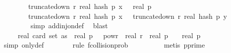 \begin{isabellebody}
\ \ \ \ \ \ \ \ truncate{\isacharunderscore}{\kern0pt}down\ r\ {\isacharparenleft}{\kern0pt}real\ {\isacharparenleft}{\kern0pt}hash\ p\ x\ {\isasymomega}{\isacharparenright}{\kern0pt}{\isacharparenright}{\kern0pt}\ {\isasymle}\ real\ p\ {\isasymand}\ \isanewline
\ \ \ \ \ \ \ \ truncate{\isacharunderscore}{\kern0pt}down\ r\ {\isacharparenleft}{\kern0pt}real\ {\isacharparenleft}{\kern0pt}hash\ p\ x\ {\isasymomega}{\isacharparenright}{\kern0pt}{\isacharparenright}{\kern0pt}\ {\isacharequal}{\kern0pt}\ truncate{\isacharunderscore}{\kern0pt}down\ r\ {\isacharparenleft}{\kern0pt}real\ {\isacharparenleft}{\kern0pt}hash\ p\ y\ {\isasymomega}{\isacharparenright}{\kern0pt}{\isacharparenright}{\kern0pt}{\isacharbraceright}{\kern0pt}{\isachardoublequoteclose}\isanewline
\ \ \ \ \ \ \ \isamarkupfalse%
\ {\isacharparenleft}{\kern0pt}simp\ add{\isacharcolon}{\kern0pt}inj{\isacharunderscore}{\kern0pt}on{\isacharunderscore}{\kern0pt}def{\isacharparenright}{\kern0pt}\ \isamarkupfalse%
\ blast\isanewline
\ \ \ \ \isamarkupfalse%
\isanewline
\ \ \ \ \isamarkupfalse%
\ \isamarkupfalse%
\ {\isachardoublequoteopen}{\isachardot}{\kern0pt}{\isachardot}{\kern0pt}{\isachardot}{\kern0pt}\ {\isasymle}\ {}\ {\isacharasterisk}{\kern0pt}\ {\isacharparenleft}{\kern0pt}real\ {\isacharparenleft}{\kern0pt}card\ {\isacharparenleft}{\kern0pt}set\ as{\isacharparenright}{\kern0pt}{\isacharparenright}{\kern0pt}{\isacharparenright}{\kern0pt}\ {\isacharasterisk}{\kern0pt}\ {\isacharparenleft}{\kern0pt}real\ p{\isacharparenright}{\kern0pt}\ {\isacharasterisk}{\kern0pt}\ {}\ powr\ {\isacharminus}{\kern0pt}\ real\ r\ {\isacharslash}{\kern0pt}\ {\isacharparenleft}{\kern0pt}real\ p{\isacharparenright}{\kern0pt}\ {\isacharplus}{\kern0pt}\ {}\ {\isacharslash}{\kern0pt}\ real\ p{\isachardoublequoteclose}\isanewline
\ \ \ \ \ \ \isamarkupfalse%
\ {\isacharparenleft}{\kern0pt}simp\ only{\isacharcolon}{\kern0pt}{\isasymOmega}def{\isacharparenright}{\kern0pt}\isanewline
\ \ \ \ \ \ \isamarkupfalse%
\ {\isacharparenleft}{\kern0pt}rule\ f{}{\isacharunderscore}{\kern0pt}collision{\isacharunderscore}{\kern0pt}prob{\isacharparenright}{\kern0pt}\isanewline
\ \ \ \ \ \ \ \ \isamarkupfalse%
\ {\isacharparenleft}{\kern0pt}metis\ p{\isacharunderscore}{\kern0pt}prime{\isacharparenright}{\kern0pt}\isanewline

\end{isabellebody}
